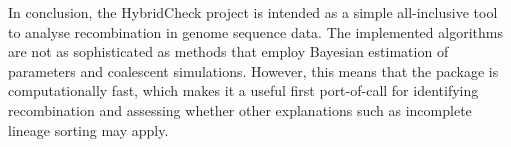 In conclusion, the HybridCheck project is intended as a simple all-inclusive tool to analyse recombination in genome sequence data. The implemented algorithms are not as sophisticated as methods that employ Bayesian estimation of parameters and coalescent simulations. However, this means that the package is computationally fast, which makes it a useful first port-of-call for identifying recombination and assessing whether other explanations such as incomplete lineage sorting may apply.
